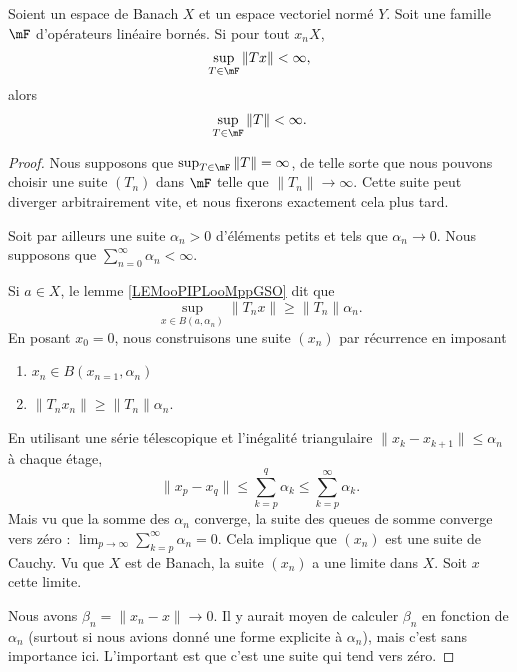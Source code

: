 \begin{theorem}
    Soient un espace de Banach \( X\) et un espace vectoriel normé \( Y\). Soit une famille \( \mF\) d'opérateurs linéaire bornés. Si pour tout \( x_n X\),
    \begin{equation}
        \sup_{T\in\mF}\| Tx \|<\infty,
    \end{equation}
    alors 
    \begin{equation}
        \sup_{T\in \mF}\| T \|<\infty.
    \end{equation}
\end{theorem}

\begin{proof}
    Nous supposons que \( \sup_{T\in\mF}\| T \|=\infty\), de telle sorte que nous pouvons choisir une suite \( (T_n)\) dans \( \mF\) telle que \( \| T_n \|\to \infty\). Cette suite peut diverger arbitrairement vite, et nous fixerons exactement cela plus tard.

    Soit par ailleurs une suite \( \alpha_n>0\) d'éléments petits et tels que \( \alpha_n\to 0\). Nous supposons que \( \sum_{n=0}^{\infty}\alpha_n<\infty\).

    Si \( a\in X\), le lemme \ref{LEMooPIPLooMppGSO} dit que
    \begin{equation}
        \sup_{x\in B(a,\alpha_n)}\| T_nx \|\geq \| T_n \|\alpha_n.
    \end{equation}
    En posant \( x_0=0\), nous construisons une suite \( (x_n)\) par récurrence en imposant
    \begin{enumerate}
        \item
            \( x_n\in B(x_{n=1}, \alpha_n)\)
        \item
            \( \| T_nx_n \|\geq \| T_n \|\alpha_n\).
    \end{enumerate}
    En utilisant une série télescopique et l'inégalité triangulaire \( \| x_k-x_{k+1} \|\leq \alpha_n\) à chaque étage,
    \begin{equation}
        \| x_p-x_q \|\leq \sum_{k=p}^q\alpha_k\leq \sum_{k=p}^{\infty}\alpha_k.
    \end{equation}
    Mais vu que la somme des \( \alpha_n\) converge, la suite des queues de somme converge vers zéro : \( \lim_{p\to \infty}\sum_{k=p}^{\infty}\alpha_n=0\). Cela implique que \( (x_n)\) est une suite de Cauchy. Vu que \( X\) est de Banach, la suite \( (x_n)\) a une limite dans \( X\). Soit \( x\) cette limite.

    Nous avons \( \beta_n=\| x_n-x \|\to 0\). Il y aurait moyen de calculer \( \beta_n\) en fonction de \( \alpha_n\) (surtout si nous avions donné une forme explicite à \( \alpha_n\)), mais c'est sans importance ici. L'important est que c'est une suite qui tend vers zéro.


\end{proof}

